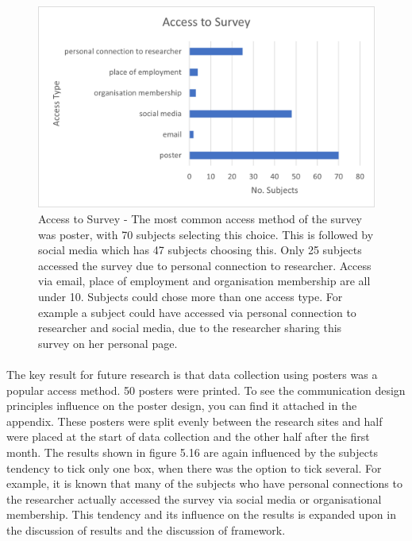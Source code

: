 \begin{figure}[H]
    \centering
    \includegraphics{fig_results/access_survey.png}
    \caption{Access to Survey - The most common access method of the survey was poster, with 70 subjects selecting this choice. This is followed by social media which has 47 subjects choosing this. Only 25 subjects accessed the survey due to personal connection to researcher. Access via email, place of employment and organisation membership are all under 10. Subjects could chose more than one access type. For example a subject could have accessed via personal connection to researcher and social media, due to the researcher sharing this survey on her personal page. }
    \label{fig:my_label}
\end{figure}
\paragraph{}

The key result for future research is that data collection using posters was a popular access method. 50 posters were printed. To see the communication design principles influence on the poster design, you can find it attached in the appendix. These posters were split evenly between the research sites and half were placed at the start of data collection and the other half after the first month. The results shown in figure 5.16 are again influenced by the subjects tendency to tick only one box, when there was the option to tick several. For example, it is known that many of the subjects who have personal connections to the researcher actually accessed the survey via social media or organisational membership. This tendency and its influence on the results is expanded upon in the discussion of results and the discussion of framework. 
\paragraph{}

